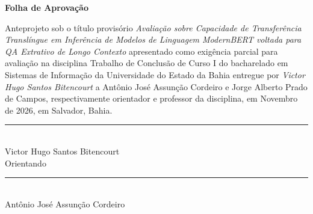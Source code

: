 \documentclass[12pt,a4paper]{article}
\begin{document}
\clearpage
\thispagestyle{empty}
\begin{center}
    {\Large \textbf{Folha de Aprovação}\par}
\end{center}
\vspace{1.5cm}

\noindent
Anteprojeto sob o título provisório \textit{Avaliação sobre Capacidade de Transferência Translíngue em Inferência de Modelos de Linguagem ModernBERT voltada para QA Extrativo de Longo Contexto} apresentado como exigência parcial para avaliação na disciplina Trabalho de Conclusão de Curso I do bacharelado em Sistemas de Informação da Universidade do Estado da Bahia entregue por \textit{Victor Hugo Santos Bitencourt} a Antônio José Assunção Cordeiro e Jorge Alberto Prado de Campos, respectivamente orientador e professor da disciplina, em Novembro de 2026, em Salvador, Bahia.

\vfill
\begin{center}
    \parbox{8.5cm}{%
        \centering
        \rule{8.5cm}{0.4pt}\\[0.2cm]
        Victor Hugo Santos Bitencourt\\[0.1cm]
        Orientando
    }

    \vspace{2.5cm}

    \parbox{8.5cm}{%
        \centering
        \rule{8.5cm}{0.4pt}\\[0.2cm]
        \mbox{}Antônio José Assunção Cordeiro
    }
\end{center}
\vfill

\clearpage
\thispagestyle{empty}
\tableofcontents

\clearpage
\pagestyle{fancy}
\hypersetup{pageanchor=true}
\setcounter{page}{4}
\end{document}

